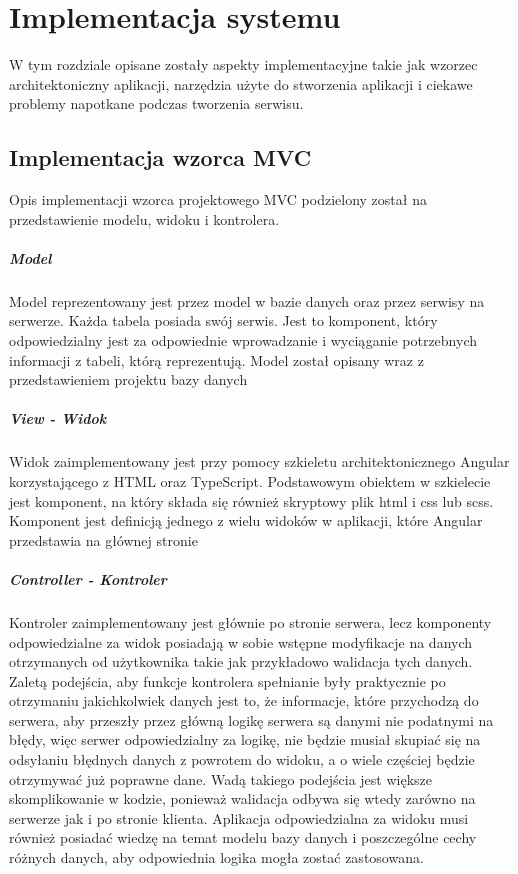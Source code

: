 \chapter{Implementacja systemu}
\thispagestyle{chapterBeginStyle}
W tym rozdziale opisane zostały aspekty implementacyjne takie jak wzorzec architektoniczny aplikacji, narzędzia użyte do stworzenia aplikacji i ciekawe problemy napotkane podczas tworzenia serwisu.
\section{Implementacja  wzorca  MVC}
Opis implementacji wzorca projektowego MVC podzielony został na przedstawienie modelu, widoku i kontrolera.
\paragraph{Model}

Model reprezentowany jest przez model w bazie danych oraz przez serwisy na serwerze. 
Każda tabela posiada swój serwis. Jest to komponent, który odpowiedzialny jest za odpowiednie wprowadzanie i wyciąganie potrzebnych informacji z tabeli, którą reprezentują. Model został opisany wraz z przedstawieniem projektu bazy danych 
\paragraph{View - Widok}


Widok zaimplementowany jest przy pomocy szkieletu architektonicznego Angular korzystającego z HTML oraz TypeScript. Podstawowym obiektem w szkielecie jest komponent, na który składa się również skryptowy plik html i css lub scss. Komponent jest definicją jednego z wielu widoków w aplikacji, które Angular przedstawia na głównej stronie 
\paragraph{Controller - Kontroler}


Kontroler zaimplementowany jest głównie po stronie serwera, lecz komponenty odpowiedzialne za widok posiadają w sobie wstępne modyfikacje na danych otrzymanych od użytkownika takie jak przykładowo walidacja tych danych. Zaletą podejścia, aby funkcje kontrolera spełnianie były praktycznie po otrzymaniu jakichkolwiek danych jest to, że informacje, które przychodzą do serwera, aby przeszły przez główną logikę serwera są danymi nie podatnymi na błędy, więc serwer odpowiedzialny za logikę, nie będzie musiał skupiać się na odsyłaniu błędnych danych z powrotem do widoku, a o wiele częściej będzie otrzymywać już poprawne dane. Wadą takiego podejścia jest większe skomplikowanie w kodzie, ponieważ walidacja odbywa się wtedy zarówno na serwerze jak i po stronie klienta. Aplikacja odpowiedzialna za widoku musi również posiadać wiedzę na temat modelu bazy danych i poszczególne cechy różnych danych, aby odpowiednia logika mogła zostać zastosowana.


